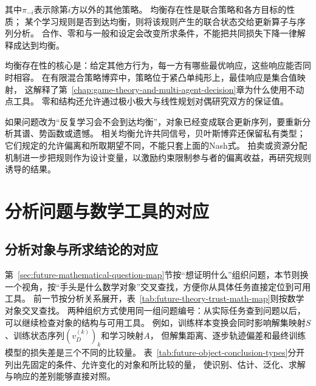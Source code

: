 其中$\pi_{-i}$表示除第$i$方以外的其他策略。
均衡存在性是联合策略和各方目标的性质；
某个学习规则是否到达均衡，则将该规则产生的联合状态交给更新算子与序列分析。
合作、零和与一般和设定会改变所求条件，不能把共同损失下降一律解释成达到均衡。

均衡存在性的核心是：给定其他方行为，每一方有哪些最优响应，这些响应能否同时相容。
在有限混合策略博弈中，策略位于紧凸单纯形上，最佳响应是集合值映射，
这解释了第~\ref{chap:game-theory-and-multi-agent-decision}章为什么使用不动点工具。
零和结构还允许通过极小极大与线性规划对偶研究双方的保证值。

如果问题改为“反复学习会不会到达均衡”，对象已经变成联合更新序列，要重新分析其谱、势函数或遗憾。
相关均衡允许共同信号，贝叶斯博弈还保留私有类型；它们规定的允许偏离和所取期望不同，不能只套上面的Nash式。
拍卖或资源分配机制进一步把规则作为设计变量，以激励约束限制参与者的偏离收益，再研究规则诱导的结果。

\section{分析问题与数学工具的对应}
\label{sec:future-mathematical-tool-roles}

\subsection{分析对象与所求结论的对应}
\label{sec:future-object-conclusion-correspondence}

第~\ref{sec:future-mathematical-question-map}节按“想证明什么”组织问题，本节则换一个视角，按“手头是什么数学对象”交叉查找，方便你从具体任务直接定位到可用工具。
前一节按分析关系展开，表~\ref{tab:future-theory-trust-math-map}则按数学对象交叉查找。
两种组织方式使用同一组问题编号：从实际任务查到问题以后，可以继续检查对象的结构与可用工具。
例如，训练样本变换会同时影响解集映射$S$、训练状态序列$(v_D^{(k)})_k$和学习映射$A$，
但解集距离、逐步轨迹偏差和最终训练模型的损失差是三个不同的比较量。
表~\ref{tab:future-object-conclusion-types}分开列出先固定的条件、允许变化的对象和所比较的量，
使识别、估计、泛化、求解与响应的差别能够直接对照。


